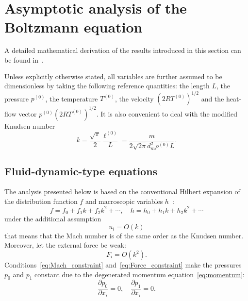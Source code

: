 \documentclass[smallextended, referee]{svjour3} %
\newcommand{\pder}[2][]{\frac{\partial#1}{\partial#2}}
\begin{document}
\section{Asymptotic analysis of the Boltzmann equation}

A detailed mathematical derivation of the results introduced in this section
can be found in~\cite{Sone2002, Sone2007}.

Unless explicitly otherwise stated, all variables are further assumed to be dimensionless
by taking the following reference quantities:
the length \(L\), the pressure \(p^{(0)}\), the temperature \(T^{(0)}\),
the velocity \((2RT^{(0)})^{1/2}\) and the heat-flow vector \(p^{(0)}(2RT^{(0)})^{1/2}\).
It is also convenient to deal with the modified Knudsen number
\[ k = \frac{\sqrt\pi}2\frac{\ell^{(0)}}{L} = \frac{m}{2\sqrt{2\pi} d_m^2 \rho^{(0)}L}. \]

\subsection{Fluid-dynamic-type equations}

The analysis presented below is based on the conventional Hilbert expansion
of the distribution function \(f\) and macroscopic variables \(h\)~\cite{Hilbert1912}:
\[ f = f_0 + f_1k + f_2k^2 + \cdots, \quad h = h_0 + h_1k + h_2k^2 + \cdots \]
under the additional assumption
\begin{equation}\label{eq:Mach_constraint}
	u_i = O(k)
\end{equation}
that means that the Mach number is of the same order as the Knudsen number.
Moreover, let the external force be weak:
\begin{equation}\label{eq:Force_constraint}
	F_i = O(k^2).
\end{equation}
Conditions~\eqref{eq:Mach_constraint} and~\eqref{eq:Force_constraint} make the pressures
\(p_0\) and \(p_1\) constant due to the degenerated momentum equation~\eqref{eq:momentum}:
\begin{equation}
	\pder[p_0]{x_i} = 0, \quad \pder[p_1]{x_i} = 0.
\end{equation}
\end{document}
